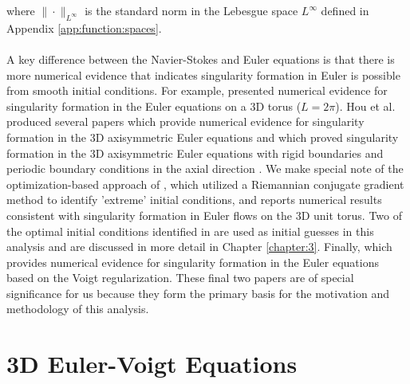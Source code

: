\noindent where $\|\cdot\|_{L^\infty}$ is the standard norm in the Lebesgue space $L^\infty$ defined in Appendix \ref{app:function:spaces}. 
\\~\\
A key difference between the Navier-Stokes and Euler equations is that there is more numerical evidence that indicates singularity formation in Euler is possible from smooth initial conditions. For example,  \cite{brachet_small-scale_1983,bustamante_interplay_2012} presented numerical evidence for singularity formation in the Euler equations on a 3D torus ($L=2\pi$). Hou et al. produced several papers which provide numerical evidence for singularity formation in the 3D axisymmetric Euler equations  
\cite{luo_potentially_2014,
hou_potential_2022,hou_potential_2023} and which proved singularity formation in the 3D axisymmetric Euler equations with rigid boundaries and periodic boundary conditions in the axial direction \cite{chen_finite_2021,chen_stable_2023}. We make special note of the optimization-based approach of \cite{zhao_systematic_2023}, which utilized a Riemannian conjugate gradient method to identify 'extreme' initial conditions, and reports numerical results consistent with singularity formation in Euler flows on the 3D unit torus. {\color{red}Two of the optimal initial conditions identified in \cite{zhao_systematic_2023} are used as initial guesses in this analysis and are discussed in more detail in Chapter {\ref{chapter:3}}}. Finally, \cite{larios_computational_2018} which provides numerical evidence for singularity formation in the Euler equations based on the Voigt regularization. These final two papers are of special significance for us because they form the primary basis for the motivation and methodology of this analysis.

\section{3D Euler-Voigt Equations}

